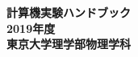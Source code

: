 \documentclass[a4j]{jsbook}
\newcommand{\nendo}{2019}
\begin{document}
\thispagestyle{empty}
\pagestyle{empty}
\begin{titlepage}
\vspace*{5cm}
\begin{center}
{\Huge\bf 計算機実験ハンドブック}\\
\vspace*{14cm}
{\LARGE\bf \nendo 年度}\\
\vspace{1.0cm}
{\LARGE\bf 東京大学理学部物理学科}
\end{center}
\end{titlepage}
\clearpage
\pagestyle{empty}
\cleardoublepage


\clearpage

\cleardoublepage

\setcounter{page}{1}
\setcounter{tocdepth}{3}
\tableofcontents

\clearpage
\pagestyle{plain}
\cleardoublepage






\end{document}
